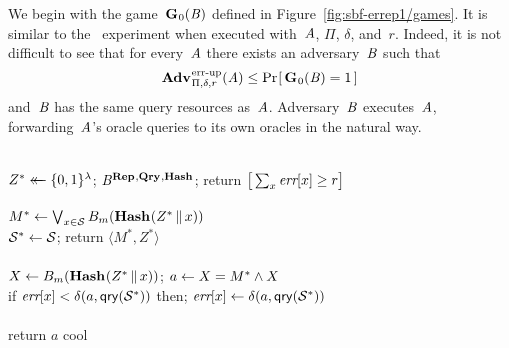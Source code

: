 We begin with the game~$\textup{\textbf{G}}\hspace{0.5pt}_0(\mathit{B})$ defined in
Figure~\ref{fig:sbf-errep1/games}. It is similar to the \errep\ experiment when
executed with~$\mathit{A}$, $\Pi$, $\delta$, and~$r$. Indeed, it is not difficult to
see that for every~$\mathit{A}$ there exists an adversary~$\mathit{B}$ such that
\begin{equation}
  \Adv{\errep}_{\Pi,\delta,r}(\advA) \leq \Prob{\game_0(\advB) = 1}
\end{equation}
and~$\mathit{B}$ has the same query resources as~$\mathit{A}$.
%
Adversary~$\mathit{B}$ executes~$\mathit{A}$, forwarding~$\mathit{A}$'s oracle queries
to its own oracles in the natural way.
%

\begin{figure*}
{
  \\[2pt]
    $Z^* \mathrel{\leftarrow\mkern-14mu\leftarrow} \{0,1\}^\lambda$;
    $\mathit{B}^{\textup{\textbf{Rep}}\hspace{0.5pt},\textup{\textbf{Qry}}\hspace{0.5pt},\textup{\textbf{Hash}}\hspace{0.5pt}}$;
    return $\big[\sum_x \textit{err}[x] \geq r\big]$
  \\[6pt]
  \oraclev{$\REPO(\col)$}\\[2pt]
    $M^* \gets \bigvee_{x \in \mathcal{S}} {B}_m(\textup{\textbf{Hash}}\hspace{0.5pt}(Z^* \, \| \, x))$\\
    $\mathcal{S}^* \gets \mathcal{S}$;
    return $\langle M^*, Z^* \rangle$
  \\[6pt]
  \\[2pt]
    $X \gets {B}_m(\textup{\textbf{Hash}}\hspace{0.5pt}(Z^* \, \| \, x))$;
    $a \gets X = M^* \wedge X$\\
    if $\textit{err}[x] < \delta(a,\mathsf{qry}(\mathcal{S}^*))$ then;
          $\textit{err}[x] \gets \delta(a,\mathsf{qry}(\mathcal{S}^*))$\\
    \\
    return $a$
}
{
  cool
}
\caption{Games for proof of Theorem~\ref{thm:sbf-errep1}.}
\label{fig:sbf-errep1/games}
\end{figure*}



